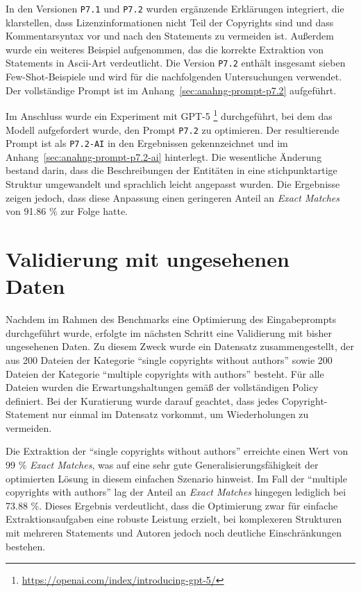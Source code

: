 In den Versionen \texttt{P7.1} und \texttt{P7.2} wurden ergänzende Erklärungen integriert, die klarstellen, dass Lizenzinformationen nicht Teil der Copyrights sind und dass Kommentarsyntax vor und nach den Statements zu vermeiden ist.
Außerdem wurde ein weiteres Beispiel aufgenommen, das die korrekte Extraktion von Statements in Ascii-Art verdeutlicht.
Die Version \texttt{P7.2} enthält insgesamt sieben Few-Shot-Beispiele und wird für die nachfolgenden Untersuchungen verwendet.
Der vollständige Prompt ist im Anhang~\ref{sec:anahng-prompt-p7.2} aufgeführt.

Im Anschluss wurde ein Experiment mit GPT-5 \footnote{\url{https://openai.com/index/introducing-gpt-5/}} durchgeführt, bei dem das Modell aufgefordert wurde, den Prompt \texttt{P7.2} zu optimieren.
Der resultierende Prompt ist als \texttt{P7.2-AI} in den Ergebnissen gekennzeichnet und im Anhang~\ref{sec:anahng-prompt-p7.2-ai} hinterlegt.
Die wesentliche Änderung bestand darin, dass die Beschreibungen der Entitäten in eine stichpunktartige Struktur umgewandelt und sprachlich leicht angepasst wurden.
Die Ergebnisse zeigen jedoch, dass diese Anpassung einen geringeren Anteil an \textit{Exact Matches} von \num{91.86} \% zur Folge hatte.


\section{Validierung mit ungesehenen Daten}

Nachdem im Rahmen des Benchmarks eine Optimierung des Eingabeprompts durchgeführt wurde, erfolgte im nächsten Schritt eine Validierung mit bisher ungesehenen Daten.
Zu diesem Zweck wurde ein Datensatz zusammengestellt, der aus \num{200} Dateien der Kategorie \enquote{single copyrights without authors} sowie \num{200} Dateien der Kategorie \enquote{multiple copyrights with authors} besteht.
Für alle Dateien wurden die Erwartungshaltungen gemäß der vollständigen Policy definiert.
Bei der Kuratierung wurde darauf geachtet, dass jedes Copyright-Statement nur einmal im Datensatz vorkommt, um Wiederholungen zu vermeiden.

Die Extraktion der \enquote{single copyrights without authors} erreichte einen Wert von \num{99} \% \textit{Exact Matches}, was auf eine sehr gute Generalisierungsfähigkeit der optimierten Lösung in diesem einfachen Szenario hinweist.
Im Fall der \enquote{multiple copyrights with authors} lag der Anteil an \textit{Exact Matches} hingegen lediglich bei \num{73.88} \%.
Dieses Ergebnis verdeutlicht, dass die Optimierung zwar für einfache Extraktionsaufgaben eine robuste Leistung erzielt, bei komplexeren Strukturen mit mehreren Statements und Autoren jedoch noch deutliche Einschränkungen bestehen.

